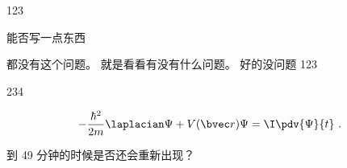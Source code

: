 
123

能否写一点东西

都没有这个问题。 就是看看有没有什么问题。 好的没问题
123

234

\begin{equation}
-\frac{\hbar^2}{2m}\laplacian\Psi + V(\bvec r)\Psi = \I\pdv{\Psi}{t}~.
\end{equation}

到 49 分钟的时候是否还会重新出现？
